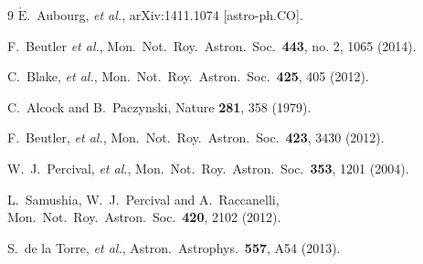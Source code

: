 \documentclass[prd,twocolumn,preprintnumbers,amsmath,amssymb,nofootinbib,english,showpacs]{revtex4-1}
\begin{document}
\begin{thebibliography}{9}
   $\acute{\mathrm{E}}$.~Aubourg, {\it et al.},
   arXiv:1411.1074 [astro-ph.CO].

  F.~Beutler {\it et al.}, %
  Mon.\ Not.\ Roy.\ Astron.\ Soc.\  {\bf 443}, no. 2, 1065 (2014).

   C.~Blake, {\it et al.},
  Mon.\ Not.\ Roy.\ Astron.\ Soc.\  {\bf 425}, 405 (2012).

  C.~Alcock and B.~Paczynski,
  Nature {\bf 281}, 358 (1979).

  F.~Beutler, {\it et al.},
  Mon.\ Not.\ Roy.\ Astron.\ Soc.\  {\bf 423}, 3430 (2012).

   W.~J.~Percival, {\it et al.},
   Mon.\ Not.\ Roy.\ Astron.\ Soc.\ {\bf 353}, 1201 (2004).

   L.~Samushia, W.~J.~Percival and A.~Raccanelli,
   Mon.\ Not.\ Roy.\ Astron.\ Soc.\ {\bf 420}, 2102 (2012).

  S.~de la Torre, {\it et al.},
  Astron.\ Astrophys.\  {\bf 557}, A54 (2013).


\end{thebibliography}
\end{document}
